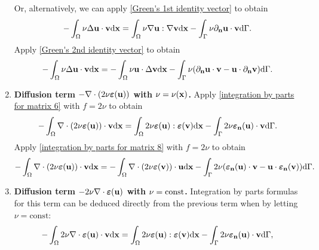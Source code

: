 \documentclass[oneside,11pt]{book}
\numberwithin{equation}{section}
\begin{document}
\begin{enumerate}[leftmargin=0mm]
    Or, alternatively, we can apply \eqref{Green's 1st identity vector} to obtain
    \begin{align*}
        -\int_\Omega \nu\Delta{\bf u}\cdot{\bf v}{\rm d}{\bf x} = \int_\Omega \nu\nabla{\bf u}:\nabla{\bf v}{\rm d}{\bf x} - \int_\Gamma \nu\partial_{\bf n}{\bf u}\cdot{\bf v}{\rm d}\Gamma.
    \end{align*}
    Apply \eqref{Green's 2nd identity vector} to obtain
    \begin{align*}
        -\int_\Omega \nu\Delta{\bf u}\cdot{\bf v}{\rm d}{\bf x} = -\int_\Omega \nu{\bf u}\cdot\Delta{\bf v}{\rm d}{\bf x} - \int_\Gamma \nu(\partial_{\bf n}{\bf u}\cdot{\bf v} - {\bf u}\cdot\partial_{\bf n}{\bf v}){\rm d}\Gamma.
    \end{align*}
    \item \textbf{Diffusion term $-\nabla\cdot(2\nu\boldsymbol{\varepsilon}({\bf u}))$ with $\nu = \nu({\bf x})$.} Apply \eqref{integration by parts for matrix 6} with $f = 2\nu$ to obtain
    \begin{align*}
        -\int_\Omega \nabla\cdot(2\nu\boldsymbol{\varepsilon}({\bf u}))\cdot{\bf v}{\rm d}{\bf x} = \int_\Omega 2\nu\boldsymbol{\varepsilon}({\bf u}):\boldsymbol{\varepsilon}({\bf v}){\rm d}{\bf x} - \int_\Gamma 2\nu\boldsymbol{\varepsilon}_{\bf n}({\bf u})\cdot{\bf v}{\rm d}\Gamma.
    \end{align*}
    Apply \eqref{integration by parts for matrix 8} with $f = 2\nu$ to obtain
    \begin{align*}
        -\int_\Omega \nabla\cdot(2\nu\boldsymbol{\varepsilon}({\bf u}))\cdot{\bf v}{\rm d}{\bf x} = -\int_\Omega \nabla\cdot(2\nu\boldsymbol{\varepsilon}({\bf v}))\cdot{\bf u}{\rm d}{\bf x} - \int_\Gamma 2\nu(\boldsymbol{\varepsilon}_{\bf n}({\bf u})\cdot{\bf v} - {\bf u}\cdot\boldsymbol{\varepsilon}_{\bf n}({\bf v})){\rm d}\Gamma.
    \end{align*}
    \item \textbf{Diffusion term $-2\nu\nabla\cdot\boldsymbol{\varepsilon}({\bf u})$ with $\nu = {\rm const}$.} Integration by parts formulas for this term can be deduced directly from the previous term when by letting $\nu = \mbox{const}$:
    \begin{align*}
        -\int_\Omega 2\nu\nabla\cdot\boldsymbol{\varepsilon}({\bf u})\cdot{\bf v}{\rm d}{\bf x} &= \int_\Omega 2\nu\boldsymbol{\varepsilon}({\bf u}):\boldsymbol{\varepsilon}({\bf v}){\rm d}{\bf x} - \int_\Gamma 2\nu\boldsymbol{\varepsilon}_{\bf n}({\bf u})\cdot{\bf v}{\rm d}\Gamma,\\

\end{align*}
\end{enumerate}
\end{document}
